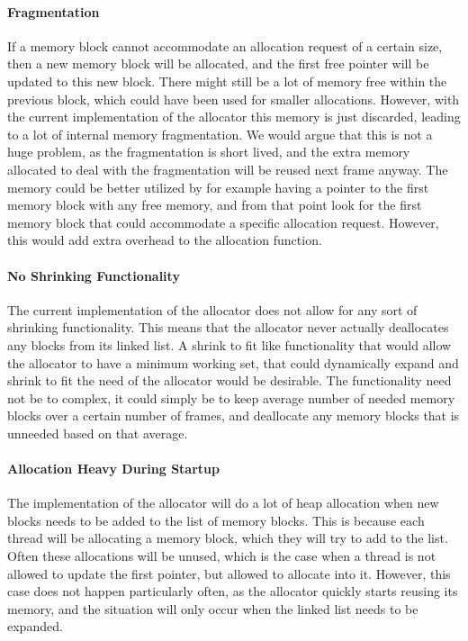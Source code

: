 \paragraph{Fragmentation}
If a memory block cannot accommodate an allocation request of a certain size, then a new memory block will be allocated,
and the first free pointer will be updated to this new block.
There might still be a lot of memory free within the previous block, which could have been used for smaller allocations.
However, with the current implementation of the allocator this memory is just discarded, leading to a lot of internal memory fragmentation.
We would argue that this is not a huge problem, as the fragmentation is short lived, and the extra memory allocated to deal with the fragmentation
will be reused next frame anyway.
The memory could be better utilized by for example having a pointer to the first memory block with any free memory, and from that point look for
the first memory block that could accommodate a specific allocation request. However, this would add extra overhead to the allocation function.

\paragraph{No Shrinking Functionality}
The current implementation of the allocator does not allow for any sort of shrinking functionality.
This means that the allocator never actually deallocates any blocks from its linked list.
A shrink to fit like functionality that would allow the allocator to have a minimum working set,
that could dynamically expand and shrink to fit the need of the allocator would be desirable.
The functionality need not be to complex, it could simply be to keep average number of needed memory blocks
over a certain number of frames, and deallocate any memory blocks that is unneeded based on that average.

\paragraph{Allocation Heavy During Startup}
The implementation of the allocator will do a lot of heap allocation when new blocks needs to be added to the list of memory blocks.
This is because each thread will be allocating a memory block, which they will try to add to the list.
Often these allocations will be unused, which is the case when a thread is not allowed to update the first pointer, but allowed to allocate into it.
However, this case does not happen particularly often, as the allocator quickly starts reusing its memory, and the situation will only occur when
the linked list needs to be expanded.

